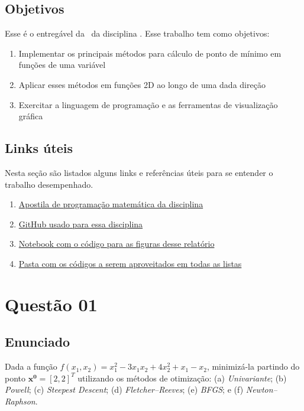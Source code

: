 \documentclass[10pt, a4paper]{article}
\begin{document}
\subsection{Objetivos}

Esse é o entregável da \TITLE \ da disciplina \DISCIPLINE. Esse trabalho tem como objetivos:

\begin{enumerate}
  \item Implementar os principais métodos para cálculo de ponto de mínimo em funções de uma variável
  \item Aplicar esses métodos em funções 2D ao longo de uma dada direção
  \item Exercitar a linguagem de programação e as ferramentas de visualização gráfica
\end{enumerate}

\subsection{Links úteis}\label{links}

Nesta seção são listados alguns links e referências úteis para se entender o trabalho desempenhado.

\begin{enumerate}
  \item \href{https://web.tecgraf.puc-rio.br/~ivan/MEC2403/ProgMatematica_VazPereiraMenezes-Ago2012.pdf}{Apostila de programação matemática da disciplina}
  \item \href{https://github.com/prj-phcp/MEC2403_Activities}{GitHub usado para essa disciplina}
  \item \href{https://github.com/prj-phcp/MEC2403_Activities/blob/master/Lista2/Lista2.ipynb}{Notebook com o código para as figuras desse relatório}
  \item \href{https://github.com/prj-phcp/MEC2403_Activities/blob/master/packages}{Pasta com os códigos a serem aproveitados em todas as listas}
\end{enumerate}

\section{Questão 01}\label{sec:q01}

\subsection{Enunciado}

Dada a função $f(x_1, x_2) = x_1^2 - 3x_1x_2 + 4x_2^2 + x_1 - x_2$, minimizá-la partindo do ponto $\mathbf{x^0} = [2, 2]^T$ utilizando os métodos de otimização: 
(a) \textit{Univariante}; (b) \textit{Powell}; (c) \textit{Steepest Descent}; 
(d) \textit{Fletcher–Reeves}; (e) \textit{BFGS}; e (f) \textit{Newton–Raphson}.
\end{document}
